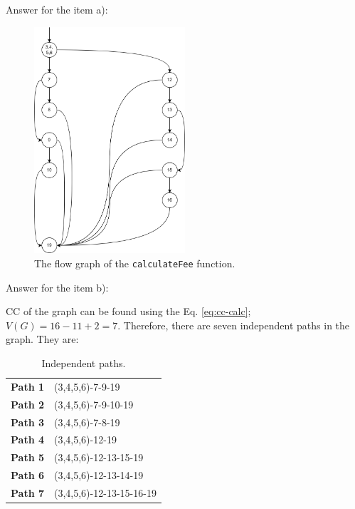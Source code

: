\begin{solution}
    Answer for the item a):
    
    \begin{figure}[H]
        \centering
        \includegraphics[width=0.5\textwidth]{images/exercise-7a-solution.png}
        \caption{The flow graph of the \lstinline!calculateFee! function.}
        \label{fig:ex7-fg}
    \end{figure}
    
    Answer for the item b):
    
    CC of the graph can be found using the Eq. \ref{eq:cc-calc}; $V(G) = 16 - 11 + 2 = 7$. Therefore, there are seven independent paths in the graph. They are:
    \begin{table}[H]
        \centering
        \renewcommand{\arraystretch}{1.2}
        \caption{Independent paths.}
        \label{tab:ex7-indep-paths}
        \begin{tabular}{p{}p{}}
            \toprule
            \textbf{Path 1} & (3,4,5,6)-7-9-19\\
            \textbf{Path 2} & (3,4,5,6)-7-9-10-19\\
            \textbf{Path 3} & (3,4,5,6)-7-8-19\\
            \textbf{Path 4} & (3,4,5,6)-12-19\\
            \textbf{Path 5} & (3,4,5,6)-12-13-15-19\\
            \textbf{Path 6} & (3,4,5,6)-12-13-14-19\\
            \textbf{Path 7} & (3,4,5,6)-12-13-15-16-19\\
            \bottomrule
        \end{tabular}
    \end{table}
    

\end{solution}
